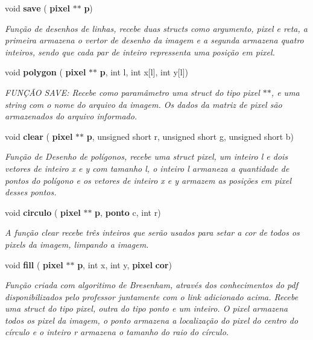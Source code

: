 \begin{DoxyCompactItemize}
void \textbf{ save} (\textbf{ pixel} $\ast$$\ast$\textbf{ p})
\begin{DoxyCompactList}\small\item\em Função de desenhos de linhas, recebe duas structs como argumento, pixel e reta, a primeira armazena o vertor de desenho da imagem e a segunda armazena quatro inteiros, sendo que cada par de inteiro repressenta uma posição em pixel. \end{DoxyCompactList}\item 
void \textbf{ polygon} (\textbf{ pixel} $\ast$$\ast$\textbf{ p}, int l, int x[l], int y[l])
\begin{DoxyCompactList}\small\item\em F\+U\+NÇÃO S\+A\+VE\+: Recebe como paramâmetro uma struct do tipo pixel $\ast$$\ast$, e uma string com o nome do arquivo da imagem. Os dados da matriz de pixel são armazenados do arquivo informado. \end{DoxyCompactList}\item 
void \textbf{ clear} (\textbf{ pixel} $\ast$$\ast$\textbf{ p}, unsigned short r, unsigned short g, unsigned short b)
\begin{DoxyCompactList}\small\item\em Função de Desenho de polígonos, recebe uma struct pixel, um inteiro l e dois vetores de inteiro x e y com tamanho l, o inteiro l armaneza a quantidade de pontos do polígono e os vetores de inteiro x e y armazem as posições em pixel desses pontos. \end{DoxyCompactList}\item 
void \textbf{ circulo} (\textbf{ pixel} $\ast$$\ast$\textbf{ p}, \textbf{ ponto} c, int r)
\begin{DoxyCompactList}\small\item\em A função clear recebe três inteiros que serão usados para setar a cor de todos os pixels da imagem, limpando a imagem. \end{DoxyCompactList}\item 
void \textbf{ fill} (\textbf{ pixel} $\ast$$\ast$\textbf{ p}, int x, int y, \textbf{ pixel} \textbf{ cor})
\begin{DoxyCompactList}\small\item\em Função criada com algoritimo de Bresenham, através dos conhecimentos do pdf disponibilizados pelo professor juntamente com o link adicionado acima. Recebe uma struct do tipo pixel, outra do tipo ponto e um inteiro. O pixel armazena todos os pixel da imagem, o ponto armazena a localização do pixel do centro do círculo e o inteiro r armazena o tamanho do raio do círculo. \end{DoxyCompactList}\item 
$$
\end{DoxyCompactItemize}
